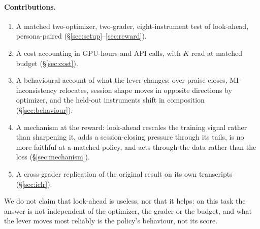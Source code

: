 \paragraph{Contributions.}
\begin{enumerate}\setlength{\itemsep}{0pt}
  \item A matched two-optimizer, two-grader, eight-instrument test of look-ahead, persona-paired (\S\ref{sec:setup}--\ref{sec:reward}).
  \item A cost accounting in GPU-hours and API calls, with $K$ read at matched budget (\S\ref{sec:cost}).
  \item A behavioural account of what the lever changes: over-praise closes, MI-inconsistency relocates, session shape moves in opposite directions by optimizer, and the held-out instruments shift in composition (\S\ref{sec:behaviour}).
  \item A mechanism at the reward: look-ahead rescales the training signal rather than sharpening it, adds a session-closing pressure through its tails, is no more faithful at a matched policy, and acts through the data rather than the loss (\S\ref{sec:mechanism}).
  \item A cross-grader replication of the original result on its own transcripts (\S\ref{sec:iclr}).
\end{enumerate}

We do not claim that look-ahead is useless, nor that it helps: on this task the answer is not
independent of the optimizer, the grader or the budget, and what the lever moves most reliably
is the policy's behaviour, not its score.
